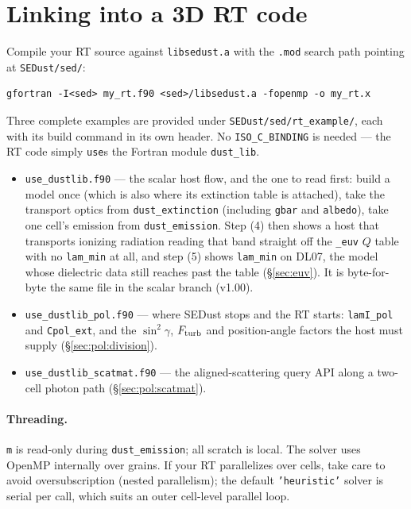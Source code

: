 \documentclass{my_memo}
\newcommand{\code}[1]{\texttt{#1}}
\begin{document}
\section{Linking into a 3D RT code}

Compile your RT source against \code{libsedust.a} with the \code{.mod} search path
pointing at \code{SEDust/sed/}:
\begin{lstlisting}[style=sh]
gfortran -I<sed> my_rt.f90 <sed>/libsedust.a -fopenmp -o my_rt.x
\end{lstlisting}
Three complete examples are provided under \code{SEDust/sed/rt\_example/}, each
with its build command in its own header. No \code{ISO\_C\_BINDING} is needed
--- the RT code simply \code{use}s the Fortran module \code{dust\_lib}.
\begin{itemize}
\item \code{use\_dustlib.f90} --- the scalar host flow, and the one to read
      first: build a model once (which is also where its extinction table is
      attached), take the transport optics from
      \code{dust\_extinction} (including \code{gbar} and \code{albedo}), take
      one cell's emission from \code{dust\_emission}. Step (4) then shows a host
      that transports ionizing radiation reading that band straight off the
      \code{\_euv} $Q$ table with no \code{lam\_min} at all, and step (5) shows
      \code{lam\_min} on DL07, the model whose dielectric data still reaches
      past the table (\S\ref{sec:euv}). It is byte-for-byte the same file in the
      scalar branch (v1.00).
\item \code{use\_dustlib\_pol.f90} --- where SEDust stops and the RT starts:
      \code{lamI\_pol} and \code{Cpol\_ext}, and the $\sin^2\gamma$, $F_{\rm
      turb}$ and position-angle factors the host must supply
      (\S\ref{sec:pol:division}).
\item \code{use\_dustlib\_scatmat.f90} --- the aligned-scattering query API
      along a two-cell photon path (\S\ref{sec:pol:scatmat}).
\end{itemize}

\paragraph{Threading.} \code{m} is read-only during \code{dust\_emission}; all
scratch is local. The solver uses OpenMP internally over grains. If your RT
parallelizes over cells, take care to avoid oversubscription (nested
parallelism); the default \code{'heuristic'} solver is serial per call, which
suits an outer cell-level parallel loop.
\end{document}

